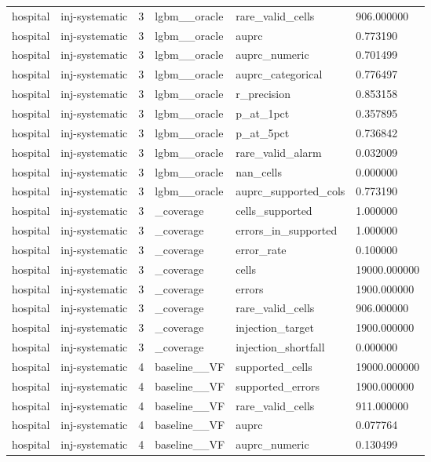 \begin{tabular}{llllll}
hospital & inj-systematic & 3 & lgbm\_\_oracle & rare\_valid\_cells & 906.000000 \\
hospital & inj-systematic & 3 & lgbm\_\_oracle & auprc & 0.773190 \\
hospital & inj-systematic & 3 & lgbm\_\_oracle & auprc\_numeric & 0.701499 \\
hospital & inj-systematic & 3 & lgbm\_\_oracle & auprc\_categorical & 0.776497 \\
hospital & inj-systematic & 3 & lgbm\_\_oracle & r\_precision & 0.853158 \\
hospital & inj-systematic & 3 & lgbm\_\_oracle & p\_at\_1pct & 0.357895 \\
hospital & inj-systematic & 3 & lgbm\_\_oracle & p\_at\_5pct & 0.736842 \\
hospital & inj-systematic & 3 & lgbm\_\_oracle & rare\_valid\_alarm & 0.032009 \\
hospital & inj-systematic & 3 & lgbm\_\_oracle & nan\_cells & 0.000000 \\
hospital & inj-systematic & 3 & lgbm\_\_oracle & auprc\_supported\_cols & 0.773190 \\
hospital & inj-systematic & 3 & \_coverage & cells\_supported & 1.000000 \\
hospital & inj-systematic & 3 & \_coverage & errors\_in\_supported & 1.000000 \\
hospital & inj-systematic & 3 & \_coverage & error\_rate & 0.100000 \\
hospital & inj-systematic & 3 & \_coverage & cells & 19000.000000 \\
hospital & inj-systematic & 3 & \_coverage & errors & 1900.000000 \\
hospital & inj-systematic & 3 & \_coverage & rare\_valid\_cells & 906.000000 \\
hospital & inj-systematic & 3 & \_coverage & injection\_target & 1900.000000 \\
hospital & inj-systematic & 3 & \_coverage & injection\_shortfall & 0.000000 \\
hospital & inj-systematic & 4 & baseline\_\_VF & supported\_cells & 19000.000000 \\
hospital & inj-systematic & 4 & baseline\_\_VF & supported\_errors & 1900.000000 \\
hospital & inj-systematic & 4 & baseline\_\_VF & rare\_valid\_cells & 911.000000 \\
hospital & inj-systematic & 4 & baseline\_\_VF & auprc & 0.077764 \\
hospital & inj-systematic & 4 & baseline\_\_VF & auprc\_numeric & 0.130499 \\

\end{tabular}
